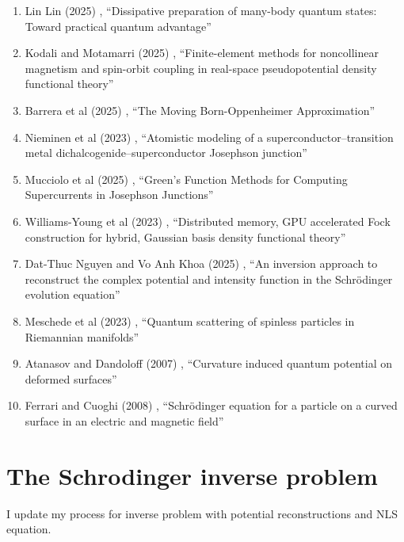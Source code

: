 \documentclass[a4paper,fleqn]{cas-sc}
\begin{document}
\begin{enumerate}
\item Lin Lin (2025) \cite{lin2025dissipative}, ``Dissipative preparation of many-body quantum states: Toward practical quantum advantage''
\item Kodali and Motamarri (2025) \cite{PhysRevB.111.195129}, ``Finite-element methods for noncollinear magnetism and spin-orbit coupling in real-space pseudopotential density functional theory''
\item Barrera et al (2025) \cite{barrera2025movingbornoppenheimerapproximation}, ``The Moving Born-Oppenheimer Approximation''
\item Nieminen et al (2023) \cite{PhysRevB.107.174524}, ``Atomistic modeling of a superconductor--transition metal dichalcogenide--superconductor Josephson junction''
\item Mucciolo et al (2025) \cite{mucciolo2025greensfunctionmethodscomputing}, ``Green's Function Methods for Computing Supercurrents in Josephson Junctions''
\item Williams-Young et al (2023) \cite{williams2023distributed}, ``Distributed memory, GPU accelerated Fock construction for hybrid, Gaussian basis density functional theory''
\item Dat-Thuc Nguyen and Vo Anh Khoa (2025) \cite{nguyen2025inversion}, ``An inversion approach to reconstruct the complex potential and intensity function in the Schr{\"o}dinger evolution equation''
\item Meschede et al (2023) \cite{PhysRevA.107.062806}, ``Quantum scattering of spinless particles in Riemannian manifolds''
\item Atanasov and Dandoloff (2007) \cite{atanasov2007curvature}, ``Curvature induced quantum potential on deformed surfaces''
\item Ferrari and Cuoghi (2008) \cite{ferrari2008schrodinger}, ``Schr{\"o}dinger equation for a particle on a curved surface in an electric and magnetic field''
\end{enumerate}

\section{The Schrodinger inverse problem}

I update my process for inverse problem with potential reconstructions and NLS equation.
\end{document}
